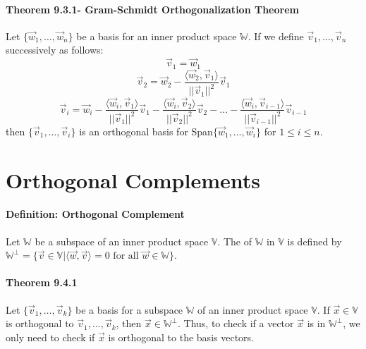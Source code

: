 \documentclass[10pt,letter]{article}
\begin{document}
\paragraph{Theorem 9.3.1- Gram-Schmidt Orthogonalization Theorem}
Let $\{\vec{w}_1,\ldots,\vec{w}_n\}$ be a basis for an inner product space $\mathbb{W}$. If we define $\vec{v}_1,\ldots,\vec{v}_n$ successively as follows: $$\vec{v}_1=\vec{w}_1$$ $$\vec{v}_2=\vec{w}_2-\frac{\langle\vec{w}_2,\vec{v}_1\rangle}{||\vec{v}_1||^2}\vec{v}_1$$ $$\vec{v}_i=\vec{w}_i-\frac{\langle\vec{w}_i,\vec{v}_1\rangle}{||\vec{v}_1||^2}\vec{v}_1-\frac{\langle\vec{w}_i,\vec{v}_2\rangle}{||\vec{v}_2||^2}\vec{v}_2-\ldots-\frac{\langle\vec{w}_i,\vec{v}_{i-1}\rangle}{||\vec{v}_{i-1}||^2}\vec{v}_{i-1}$$ then $\{\vec{v}_1,\ldots,\vec{v}_i\}$ is an orthogonal basis for Span$\{\vec{w}_1,\ldots,\vec{w}_i\}$ for $1\leq i\leq n$. 

\section*{Orthogonal Complements}
\paragraph{Definition: Orthogonal Complement}
Let $\mathbb{W}$ be a subspace of an inner product space $\mathbb{V}$. The  of $\mathbb{W}$ in $\mathbb{V}$ is defined by $\mathbb{W}^\perp=\{\vec{v}\in\mathbb{V}|\langle\vec{w},\vec{v}\rangle=0\text{ for all }\vec{w}\in\mathbb{W}\}$. 

\paragraph{Theorem 9.4.1}
Let $\{\vec{v}_1,\ldots,\vec{v}_k\}$ be a basis for a subspace $\mathbb{W}$ of an inner product space $\mathbb{V}$. If $\vec{x}\in\mathbb{V}$ is orthogonal to $\vec{v}_1,\ldots,\vec{v}_k$, then $\vec{x}\in\mathbb{W}^\perp$. Thus, to check if a vector $\vec{x}$ is in $\mathbb{W}^\perp$, we only need to check if $\vec{x}$ is orthogonal to the basis vectors.
\end{document}
